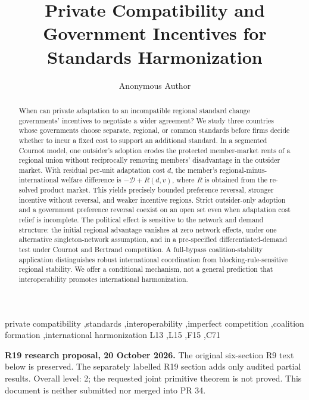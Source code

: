 \documentclass[12pt,review,authoryear,nopreprintline]{elsarticle}
\newcommand{\RnineteenLevel}{2}
\begin{document}
\begin{frontmatter}
\title{Private Compatibility and Government Incentives for Standards Harmonization}
\author{Anonymous Author}
\begin{abstract}
When can private adaptation to an incompatible regional standard change governments' incentives to negotiate a wider agreement? We study three countries whose governments choose separate, regional, or common standards before firms decide whether to incur a fixed cost to support an additional standard. In a segmented Cournot model, one outsider's adoption erodes the protected member-market rents of a regional union without reciprocally removing members' disadvantage in the outsider market. With residual per-unit adaptation cost $d$, the member's regional-minus-international welfare difference is $-\mathscr D+R(d,v)$, where $R$ is obtained from the re-solved product market. This yields precisely bounded preference reversal, stronger incentive without reversal, and weaker incentive regions. Strict outsider-only adoption and a government preference reversal coexist on an open set even when adaptation cost relief is incomplete. The political effect is sensitive to the network and demand structure: the initial regional advantage vanishes at zero network effects, under one alternative singleton-network assumption, and in a pre-specified differentiated-demand test under Cournot and Bertrand competition. A full-bypass coalition-stability application distinguishes robust international coordination from blocking-rule-sensitive regional stability. We offer a conditional mechanism, not a general prediction that interoperability promotes international harmonization.
\end{abstract}
\begin{keyword}
private compatibility \sep standards \sep interoperability \sep imperfect competition \sep coalition formation \sep international harmonization
\JEL L13 \sep L15 \sep F15 \sep C71
\end{keyword}
\end{frontmatter}
\noindent\begin{minipage}{\linewidth}
\textbf{R19 research proposal, 20 October 2026.} The original
six-section R9 text below is preserved. The separately labelled R19
section adds only audited partial results. Overall level:
\RnineteenLevel; the requested joint primitive theorem is not proved.
This document is neither submitted nor merged into PR 34.
\end{minipage}\par
\end{document}
